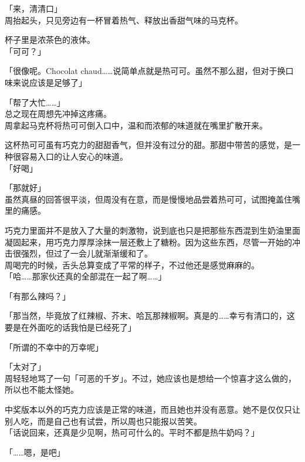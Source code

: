 「来，清清口」\\

周抬起头，只见旁边有一杯冒着热气、释放出香甜气味的马克杯。

杯子里是浓茶色的液体。\\

「可可？」

「很像呢。Chocolat chaud……说简单点就是热可可。虽然不那么甜，但对于换口味来说应该是足够了」

「帮了大忙……」\\

总之现在周想先冲掉这疼痛。\\

周拿起马克杯将热可可倒入口中，温和而浓郁的味道就在嘴里扩散开来。

这杯热可可虽有巧克力的甜甜香气，但并没有过分的甜。那甜中带苦的感觉，是一种很容易入口的让人安心的味道。\\

「好喝」

「那就好」\\

虽然真昼的回答很平淡，但周没有在意，而是慢慢地品尝着热可可，试图掩盖住嘴里的痛感。

巧克力里面并不是放入了大量的刺激物，说到底也只是把那些东西混到生奶油里面凝固起来，用巧克力厚厚涂抹一层还敷上了糖粉。因为这些东西，尽管一开始的冲击很强烈，但过了一会儿就渐渐缓和了。\\

周喝完的时候，舌头总算变成了平常的样子，不过他还是感觉麻麻的。\\

「哈……那家伙还真的全部混在一起了啊……」

「有那么辣吗？」

「那当然，毕竟放了红辣椒、芥末、哈瓦那辣椒啊。真是的……幸亏有清口的，这要是在外面吃的话我怕是已经死了」

「所谓的不幸中的万幸呢」

「太对了」\\

周轻轻地骂了一句「可恶的千岁」。不过，她应该也是想给一个惊喜才这么做的，所以也不能太怪她。

中奖版本以外的巧克力应该是正常的味道，而且她也并没有恶意。她不是仅仅只让别人吃，而是自己也有试尝，所以周也只能报以苦笑。\\

「话说回来，还真是少见啊，热可可什么的。平时不都是热牛奶吗？」

「……嗯，是吧」

